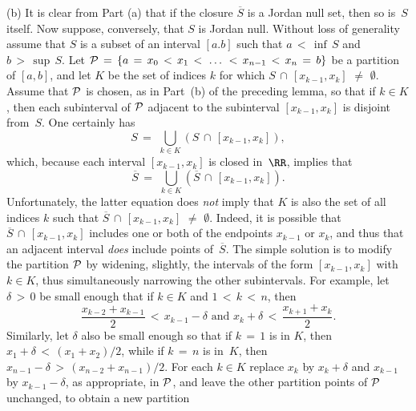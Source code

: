          (b) It is clear from Part (a) that if the closure $\overline{S}$ is a Jordan null set, then so is~$S$ itself.
        Now suppose, conversely, that $S$ is Jordan null. Without loss of generality assume that $S$ is a subset of an interval $[a.b]$ such that $a\,<\, {\inf}\,S$ and $b\,>\,{\sup}\,S$. Let ${\cal P} \,=\, \{a \,=\, x_{0}\,<\,x_{1}\,<\,\,{\ldots}\,\,<\,x_{n-1}\,<\,x_{n} \,=\, b\}$ be a partition of $[a,b]$,
    and let $K$ be the set of indices $k$ for which $S\,{\cap}\,[x_{k-1}, x_{k}]  \,\,{\neq}\,\,  {\emptyset}$.
    Assume that ${\cal P}$ is chosen, as in Part~(b) of the preceding lemma, so that if $k{\in}K$, then each subinterval of ${\cal P}$ adjacent to the subinterval $[x_{k-1},x_{k}]$ is disjoint from~$S$.
    One certainly has
        \begin{displaymath}
        S \,=\, \,{\bigcup}_{k{\in}K} \left(S\,{\cap}\,[x_{k-1},x_{k}]\right),
        \end{displaymath}
    which, because each interval $[x_{k-1},x_{k}]$ is closed in~${\RR}$, implies that
        \begin{displaymath}
        \overline{S} \,=\, \,{\bigcup}_{k{\in}K} \left(\overline{S}\,{\cap}\,[x_{k-1},x_{k}]\right).
        \end{displaymath}
    Unfortunately, the latter equation does {\em not} imply that $K$ is also the set of all indices $k$ such that $\overline{S}\,{\cap}\,[x_{k-1},x_{k}] \,\,{\neq}\,\, {\emptyset}$.
    Indeed, it is possible that $\overline{S}\,{\cap}\,[x_{k-1},x_{k}]$ includes one or both of the endpoints $x_{k-1}$ or $x_{k}$,
    and thus that an adjacent interval {\em does} include points of~$\overline{S}$. The simple solution is to modify the partition ${\cal P}$ by widening, slightly,
    the intervals of the form $[x_{k-1},x_{k}]$ with $k{\in}K$, thus simultaneously narrowing the other subintervals.
    For example, let ${\delta}\,>\,0$ be small enough that if $k{\in}K$ and $1\,<\,k\,<\,n$, then
        \begin{displaymath}
        \frac{x_{k-2}+x_{k-1}}{2}\,<\,x_{k-1} - {\delta}
        \mbox{ and }
        x_{k} + {\delta}\,<\,\frac{x_{k+1}+x_{k}}{2}.
        \end{displaymath}
    Similarly, let ${\delta}$ also be small enough so that if $k \,=\, 1$ is in $K$, then $x_{1} + {\delta}\,<\,(x_{1}+x_{2})/2$,
    while if $k \,=\, n$ is in~$K$, then $x_{n-1}-{\delta}\,>\,(x_{n-2} + x_{n-1})/2$. For each $k{\in}K$ replace $x_{k}$ by $x_{k}+{\delta}$ and $x_{k-1}$ by $x_{k-1}-{\delta}$,
    as appropriate, in ${\cal P}$, and leave the other partition points of ${\cal P}$ unchanged, to obtain a new partition
